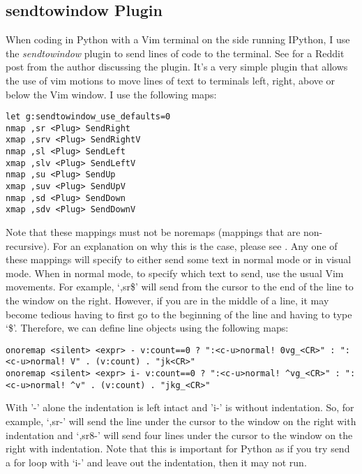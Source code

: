 \subsection{sendtowindow Plugin}
When coding in Python with a Vim terminal on the side running IPython, I use the
\textit{sendtowindow} plugin \cite{KKPMW2016send} to send lines of code to the
terminal. See \cite{KKPMW2019send} for a Reddit post from the author discussing
the plugin. It's a very simple plugin that allows the use of vim motions to move
lines of text to terminals left, right, above or below the Vim window. I use the
following maps:\\
\begin{lstlisting}
let g:sendtowindow_use_defaults=0
nmap ,sr <Plug> SendRight
xmap ,srv <Plug> SendRightV
nmap ,sl <Plug> SendLeft
xmap ,slv <Plug> SendLeftV
nmap ,su <Plug> SendUp
xmap ,suv <Plug> SendUpV
nmap ,sd <Plug> SendDown
xmap ,sdv <Plug> SendDownV
\end{lstlisting}
Note that these mappings must not be noremaps (mappings that are non-recursive). For an
explanation on why this is the case, please see \cite{justrajdeep2018please}.
Any one of these mappings will specify to either send some text in normal mode
or in visual mode. When in normal mode, to specify which text to send, use the
usual Vim movements. For example, `,sr\$' will send from the cursor to the end
of the line to the window on the right. However, if you are in the middle of a
line, it may become tedious having to first go to the beginning of the line and
having to type `\$'. Therefore, we can define line objects using the following
maps:
\begin{lstlisting}
onoremap <silent> <expr> - v:count==0 ? ":<c-u>normal! 0vg_<CR>" : ":<c-u>normal! V" . (v:count) . "jk<CR>"
onoremap <silent> <expr> i- v:count==0 ? ":<c-u>normal! ^vg_<CR>" : ":<c-u>normal! ^v" . (v:count) . "jkg_<CR>"
\end{lstlisting}
With '-' alone the indentation is left intact and 'i-' is without indentation.
So, for example, `,sr-' will send the line under the cursor to the window on
the right with indentation and `,sr8-' will send four lines under the cursor to
the window on the right with indentation. Note that this is important for Python as if you try
send a for loop with `i-' and leave out the indentation, then it may not run.\\

